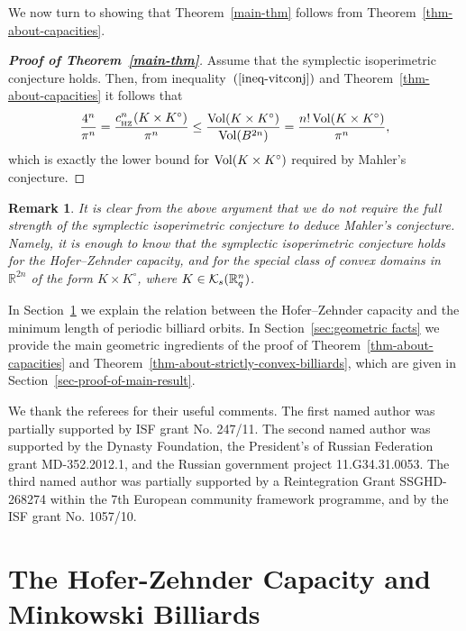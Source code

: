 \documentclass[11pt]{article}
\newtheorem{remark}[lemma]{Remark}
\begin{document}
{We now turn to showing that  Theorem~\ref{main-thm} follows from Theorem~\ref{thm-about-capacities}.
\begin{proof}[{\bf Proof of Theorem~\ref{main-thm}}]
Assume that the symplectic isoperimetric conjecture holds. Then, from inequality~$(\ref{ineq-vitconj})$ and Theorem~\ref{thm-about-capacities} it follows that
$$ {\frac {4^n} {\pi^n}} = {\frac {c^n_{_{\rm HZ}}(K \times K^{\circ})} {\pi^n}}
 \leq   {\frac {{\rm Vol}(K \times K^{\circ}) } {{\rm Vol}(B^{2n})} }  =  {\frac {n! \, {\rm Vol}(K \times K^{\circ})} {{\pi^n}}
},
$$
which  is exactly the lower bound for  ${\rm Vol}(K \times
K^{\circ})$ required by Mahler's conjecture.
\end{proof}

\begin{remark} {\rm
 It is clear from the above argument that we do not require the full strength of the symplectic isoperimetric conjecture to deduce Mahler's conjecture. Namely,
it is enough to know that the symplectic isoperimetric conjecture holds for the Hofer--Zehnder capacity, and for the special class of
convex domains in ${\mathbb R}^{2n}$ of the form $K \times K^{\circ}$, where $K \in {\cal K}_s({\mathbb R}^n_q)$.


}
\end{remark}
In Section~\ref{sec-HZ-Mink-billiards} we explain the relation between the Hofer--Zehnder capacity and the minimum length 
of periodic billiard orbits. In Section~\ref{sec:geometric facts} we provide the main geometric ingredients of the proof
of Theorem~\ref{thm-about-capacities} and Theorem~\ref{thm-about-strictly-convex-billiards}, which are given in Section~\ref{sec-proof-of-main-result}.

We thank the referees for their useful comments. The first named author was partially supported by ISF grant No. 247/11. The second named author was supported by the Dynasty Foundation, the President's of Russian Federation grant MD-352.2012.1, and the Russian government project 11.G34.31.0053. The third named author was partially supported by a Reintegration Grant SSGHD-268274 within the 7th European community framework programme, and by the ISF grant No. 1057/10.

\section{The Hofer-Zehnder Capacity and Minkowski Billiards } \label{sec-HZ-Mink-billiards}

}
\end{document}
